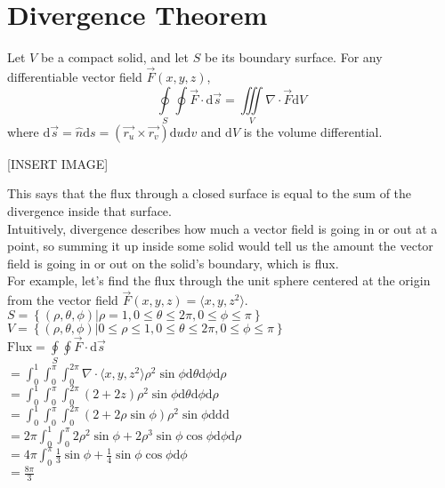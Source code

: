 \section{Divergence Theorem}
\begin{theorem}
	Let $V$ be a compact solid, and let $S$ be its boundary surface. For any differentiable vector field $\vec{F}(x,y,z)$, $$\oint\limits_{S}{\oint{\vec{F}\cdot\mathrm{d}\vec{s}}}=\iiint\limits_{V}{\nabla\cdot\vec{F}\mathrm{d}V}$$
	where $\mathrm{d}\vec{s}=\hat{n}\mathrm{d}s=(\vec{r_u}\times\vec{r_v})\mathrm{d}u\mathrm{d}v$ and $\mathrm{d}V$ is the volume differential.
\end{theorem}

[INSERT IMAGE]

\noindent
This says that the flux through a closed surface is equal to the sum of the divergence inside that surface.\\
Intuitively, divergence describes how much a vector field is going in or out at a point, so summing it up inside some solid would tell us the amount the vector field is going in or out on the solid’s boundary, which is flux.\\

\noindent
For example, let’s find the flux through the unit sphere centered at the origin from the vector field $\vec{F}(x,y,z)=\langle x,y,z^2\rangle$.\\
\indent
$S=\left\{(\rho,\theta,\phi)|\rho=1, 0\leq\theta\leq 2\pi, 0\leq\phi\leq\pi\right\}$\\
\indent
$V=\left\{(\rho,\theta,\phi)|0\leq\rho\leq 1, 0\leq\theta\leq 2\pi, 0\leq\phi\leq\pi\right\}$\\
\indent
$\text{Flux}=\oint\limits_{S}{\oint{\vec{F}\cdot\mathrm{d}\vec{s}}}$\\
\indent
$=\int_{0}^{1}{\int_{0}^{\pi}{\int_{0}^{2\pi}{\nabla\cdot\langle x,y,z^2\rangle\rho^2\sin{\phi}\mathrm{d}\theta}\mathrm{d}\phi}\mathrm{d}\rho}$\\
\indent
$=\int_{0}^{1}{\int_{0}^{\pi}{\int_{0}^{2\pi}{(2+2z)\rho^2\sin{\phi}\mathrm{d}\theta}\mathrm{d}\phi}\mathrm{d}\rho}$\\
\indent
$=\int_{0}^{1}{\int_{0}^{\pi}{\int_{0}^{2\pi}{(2+2\rho\sin{\phi})\rho^2\sin{\phi}\mathrm{d}}\mathrm{d}}\mathrm{d}}$\\
\indent
$=2\pi\int_{0}^{1}{\int_{0}^{\pi}{2\rho^2\sin{\phi}+2\rho^3\sin{\phi}\cos{\phi}\mathrm{d}\phi}\mathrm{d}\rho}$\\
\indent
$=4\pi\int_{0}^{\pi}{\frac{1}{3}\sin{\phi}+\frac{1}{4}\sin{\phi}\cos{\phi}\mathrm{d}\phi}$\\
\indent
$=\frac{8\pi}{3}$


